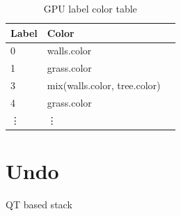 \begin{table}[h]
	\begin{center}
	\begin{tabular}{|l|l|l|}
	\hline
	Label & Color  \\
	\hline
	0       & walls.color \\
	1       & grass.color \\
	3       & mix(walls.color, tree.color)	\\
	4       & grass.color	\\
	\vdots     & \vdots      \\
	\hline
	\end{tabular}
	\end{center}
	\caption{GPU label color table}
\end{table}


\section{Undo}
QT based stack